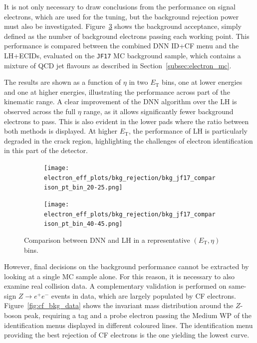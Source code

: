 
It is not only necessary to draw conclusions from the performance on signal electrons, which are used for the tuning, but the background rejection power must also be investigated. Figure~\ref{fig:bkg_acceptance_mc} shows the background acceptance, simply defined as the number of background electrons passing each working point. This performance is compared between the combined DNN ID+CF menu and the LH+ECIDs, evaluated on the \texttt{JF17} MC background sample, which contains a mixture of QCD jet flavours as described in Section~\ref{subsec:electron_mc}. 

The results are shown as a function of $\eta$ in two $E_{\mathrm{T}}$ bins, one at lower energies and one at higher energies, illustrating the performance across part of the kinematic range. A clear improvement of the DNN algorithm over the LH is observed across the full $\eta$ range, as it allows significantly fewer background electrons to pass. This is also evident in the lower pads where the ratio between both methods is displayed. At higher $E_{\mathrm{T}}$, the performance of LH is particularly degraded in the crack region, highlighting the challenges of electron identification in this part of the detector.

\begin{figure}[htbp]
  \centering
  \begin{subfigure}{0.48\textwidth}
    \centering
    \texttt{[image: electron\_eff\_plots/bkg\_rejection/bkg\_jf17\_comparison\_pt\_bin\_20-25.png]}
    \caption{}
    \label{fig:bkg_acceptance_jf17_20_25}
  \end{subfigure}
  \hfill
  \begin{subfigure}{0.48\textwidth}
    \centering
    \texttt{[image: electron\_eff\_plots/bkg\_rejection/bkg\_jf17\_comparison\_pt\_bin\_40-45.png]}
    \caption{}
    \label{fig:bkg_acceptance_jf17_40_45}
  \end{subfigure}
\caption{Comparison between DNN and LH in a representative $(E_{\mathrm{T}},\eta)$ bins.}
\label{fig:bkg_acceptance_mc}
\end{figure}


However, final decisions on the background performance cannot be extracted by looking at a single MC sample alone. For this reason, it is necessary to also examine real collision data. A complementary validation is performed on same-sign $Z\to e^{+}e^{-}$ events in data, which are largely populated by CF electrons. Figure~\ref{fig:cf_bkg_data} shows the invariant mass distribution around the $Z$-boson peak, requiring a tag and a probe electron passing the Medium WP of the identification menus displayed in different coloured lines. The identification menu providing the best rejection of CF electrons is the one yielding the lowest curve. 

